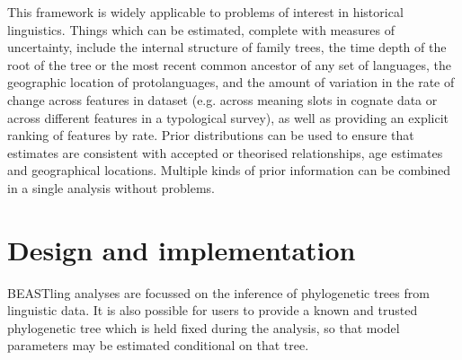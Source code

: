\documentclass[10pt,a4paper]{article}
\begin{document}
This framework is widely applicable to problems of interest in historical linguistics.  Things which can be estimated, complete with measures of uncertainty, include the internal structure of family trees, the time depth of the root of the tree or the most recent common ancestor of any set of languages, the geographic location of protolanguages, and the amount of variation in the rate of change across features in dataset (e.g. across meaning slots in cognate data or across different features in a typological survey), as well as providing an explicit ranking of features by rate.  Prior distributions can be used to ensure that estimates are consistent with accepted or theorised relationships, age estimates and geographical locations.  Multiple kinds of prior information can be combined in a single analysis without problems.

\section{Design and implementation}

BEASTling analyses are focussed on the inference of phylogenetic trees from linguistic data.  It is also possible for users to provide a known and trusted phylogenetic tree which is held fixed during the analysis, so that model parameters may be estimated conditional on that tree.
\end{document}
